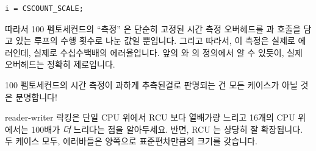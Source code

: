 {\vspace{5pt}
\begin{minipage}[t]{\columnwidth}
\scriptsize
\begin{verbatim}
i = CSCOUNT_SCALE;
\end{verbatim}
\end{minipage}
\vspace{5pt}

	따라서 100 펨토세컨드의 ``측정'' 은 단순히 고정된 시간 측정 오버헤드를
	 과  호출을 담고 있는 루프의
	수행 횟수로 나눈 값일 뿐입니다.
	그리고 따라서, 이 측정은 실제로 에러인데, 실제로 수십수백배의
	에러율입니다.
	앞의  와  의 정의에서 알 수
	있듯이, 실제 오버헤드는 정확히 제로입니다.

	100 펨토세컨드의 시간 측정이 과하게 추측된걸로 판명되는 건 모든
	케이스가 아닐 것은 분명합니다!

} \QuickQuizEnd

reader-writer 락킹은 단일 CPU 위에서 RCU 보다 열배가량 느리고 16개의 CPU
위에서는 100배가 \emph{더} 느리다는 점을 알아두세요.
반면, RCU 는 상당히 잘 확장됩니다.
두 케이스 모두, 에러바들은 양쪽으로 표준편차만큼의 크기를 갖습니다.

